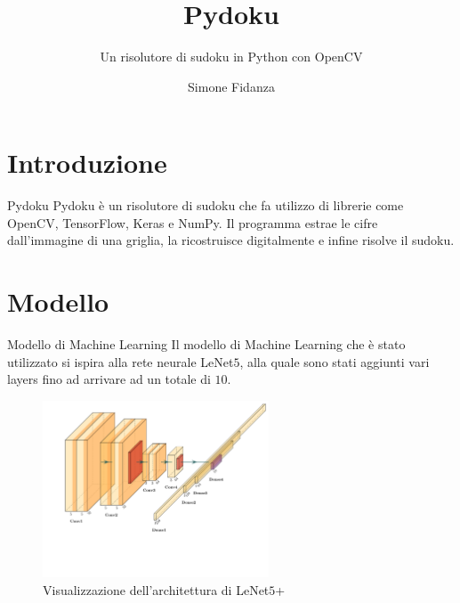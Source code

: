 \documentclass[10pt]{beamer}
\title{Pydoku}
\subtitle{Un risolutore di sudoku in Python con OpenCV}
\date{\DTMDisplaydate{2022}{07}{22}{}}
\author{Simone Fidanza}
\institute{Università degli studi di Bari ``Aldo Moro''}
\begin{document}
\maketitle


\section[Introduzione]{Introduzione}
\begin{frame}[fragile]{Pydoku}
    Pydoku è un risolutore di sudoku che fa utilizzo di librerie come OpenCV,
    TensorFlow, Keras e NumPy. Il programma estrae le cifre dall'immagine di
    una griglia, la ricostruisce digitalmente e infine risolve il sudoku.
\end{frame}


\section{Modello}
\begin{frame}{Modello di Machine Learning}
    Il modello di Machine Learning che è stato utilizzato si ispira alla rete
    neurale LeNet\(5\), alla quale sono stati aggiunti vari layers fino ad
    arrivare ad un totale di \(10\).
%
    \begin{figure}[b]
        \includegraphics[width=0.6\textwidth, trim = 1cm 4.5cm 0cm 1cm]{architecture.pdf}
        \caption{Visualizzazione dell'architettura di LeNet\(5\)+}\label{fig:lenet}
    \end{figure}
\end{frame}
\end{document}
